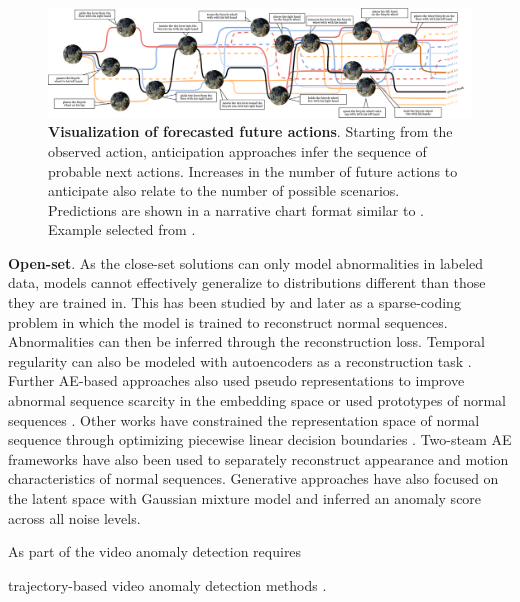 \documentclass[smallextended,twocolumn,natbib]{svjour3}
\begin{document}
\begin{figure}[!ht]
    \centering
    \includegraphics[width=\linewidth,trim={0cm 0 0cm 0},clip]{figs/narrative_chart_ego_exo.pdf}
    \caption{\textbf{Visualization of forecasted future actions}. Starting from the observed action, anticipation approaches infer the sequence of probable next actions. Increases in the number of future actions to anticipate also relate to the number of possible scenarios. Predictions are shown in a narrative chart format similar to \citep{randal2009movie}.
    Example selected from \citep{grauman2024ego}.} 
    \label{fig:narration_chart}
\end{figure}

\noindent
\textbf{Open-set}. As the close-set solutions can only model abnormalities in labeled data, models cannot effectively generalize to distributions different than those they are trained in. This has been studied by \citet{zhao2011online} and later \citet{luo2017revisit} as a sparse-coding \citep{lee2006efficient} problem in which the model is trained to reconstruct normal sequences. Abnormalities can then be inferred through the reconstruction loss. Temporal regularity can also be modeled with autoencoders as a reconstruction task \citep{hasan2016learning}. Further AE-based approaches also used pseudo representations to improve abnormal sequence scarcity in the embedding space \citep{astrid2021synthetic,astrid2021learning} or used prototypes of normal sequences \citep{park2020learning}. Other works have constrained the representation space of normal sequence through optimizing piecewise linear decision boundaries \citep{wang2019gods}. Two-steam AE frameworks \citep{cho2022unsupervised,nguyen2019anomaly} have also been used to separately reconstruct appearance and motion characteristics of normal sequences. Generative approaches \citep{micorek2024mulde} have also focused on the latent space with Gaussian mixture model and inferred an anomaly score across all noise levels.

As part of the video anomaly detection requires 
\citep{fioresi2023ted}

trajectory-based video anomaly detection methods
\citep{markovitz2020graph,morais2019learning,flaborea2023multimodal,stergiou2024holistic}.
\end{document}
